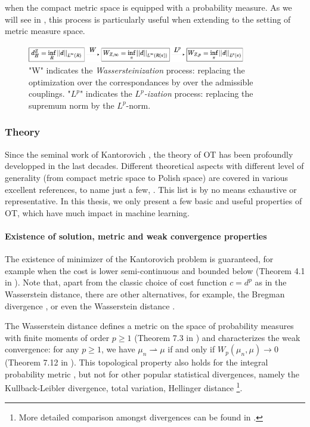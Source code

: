 when the compact metric space is equipped with a probability measure.
As we will see in , this process is particularly useful
when extending to the setting of metric measure space.
\begin{figure}[ht]
  \centering
  \includegraphics[width=0.85\textwidth,keepaspectratio]{Chapitre1/figures/wass_motiv.pdf}
  \caption{"W" indicates the \textit{Wassersteinization} process: replacing the optimization over the correspondances by over the admissible couplings.
  "$L^p$" indicates the \textit{$L^p$-ization} process: replacing the supremum norm by the $L^p$-norm.}
  \label{fig:wass_motiv}
\end{figure}
\subsubsection{Theory}
Since the seminal work of Kantorovich \citep{Kanto42},
the theory of OT has been profoundly developped in the last decades.
Different theoretical aspects with different level of generality
(from compact metric space to Polish space) are covered in various excellent references,
to name just a few, \citep{Villani03,Villani08,Fillipo15,Ambrosio05}. This list is
by no means exhaustive or representative. In this thesis, we only present a few
basic and useful properties of OT, which have much impact in machine learning.

\paragraph{Existence of solution, metric and weak convergence properties}
The existence of minimizer of the Kantorovich problem is guaranteed,
for example when the cost is lower semi-continuous and bounded below
(Theorem 4.1 in \citep{Villani08}). Note that,
apart from the classic choice of cost function $c = d^p$ as in the Wasserstein distance,
there are other alternatives, for example, the Bregman divergence \citep{Guo21},
or even the Wasserstein distance \citep{Huizing22}.

The Wasserstein distance defines a metric
on the space of probability measures with finite moments of order $p \geq 1$
(Theorem 7.3 in \citep{Villani03}) and characterizes the weak convergence: for any $p \geq 1$,
we have $\mu_n \rightharpoonup \mu$ if and only if $W_p(\mu_n, \mu) \to 0$
(Theorem 7.12 in \citep{Villani03}).
This topological property also holds for the integral probability metric \citep{Muller97},
but not for other popular statistical divergences, namely the Kullback-Leibler divergence,
total variation, Hellinger distance
\footnote{More detailed comparison amongst divergences can be found in \citep{Gibbs02}.}.

